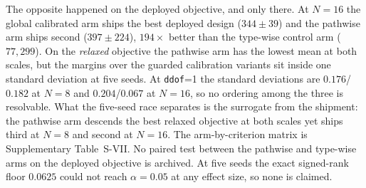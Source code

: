 \documentclass[journal]{IEEEtran}
\begin{document}
The opposite happened on the deployed objective, and only there.  At $N=16$ the
global calibrated arm ships the best deployed design ($344\pm39$) and the
pathwise arm ships second ($397\pm224$), $194\times$ better than the type-wise
control arm ($77{,}299$).  On the \emph{relaxed} objective the pathwise arm has
the lowest mean at both scales, but the margins over the guarded calibration
variants sit inside one standard deviation at five seeds.  At \texttt{ddof}=1 the
standard deviations are $0.176$/$0.182$ at $N=8$ and $0.204$/$0.067$ at $N=16$,
so no ordering among the three is resolvable.  What the five-seed race separates
is the surrogate from the shipment: the pathwise arm descends the best relaxed
objective at both scales yet ships third at $N=8$ and second at $N=16$.  The arm-by-criterion matrix is Supplementary Table~S-VII.  No paired test between the pathwise and type-wise arms on the deployed objective
is archived.  At five seeds the exact signed-rank floor $0.0625$ could not reach
$\alpha=0.05$ at any effect size, so none is claimed.
\end{document}
